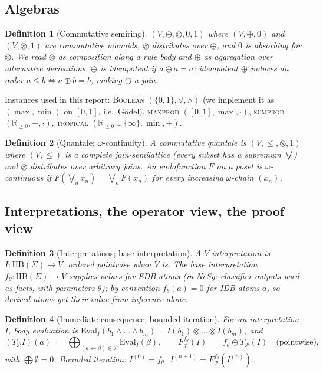 \documentclass[10pt]{article}
\newtheorem{definition}{Definition}[section]
\theoremstyle{remark}
\newcommand{\HB}{\mathrm{HB}}
\newcommand{\Eval}{\mathrm{Eval}}
\begin{document}
\subsection{Algebras}

\begin{definition}[Commutative semiring]\label{def:semiring}
$(V,\oplus,\otimes,0,1)$ where $(V,\oplus,0)$ and $(V,\otimes,1)$ are commutative monoids,
$\otimes$ distributes over $\oplus$, and $0$ is absorbing for $\otimes$. We read $\otimes$ as
composition along a rule body and $\oplus$ as aggregation over alternative derivations. $\oplus$ is
\emph{idempotent} if $a \oplus a = a$; idempotent $\oplus$ induces an order $a \le b
\Leftrightarrow a \oplus b = b$, making $\oplus$ a join.
\end{definition}

Instances used in this report: \textsc{Boolean} $(\{0,1\},\vee,\wedge)$ (we implement it as
$(\max,\min)$ on $[0,1]$, i.e.\ G\"odel), \textsc{maxprod} $([0,1],\max,\cdot)$,
\textsc{sumprod} $(\mathbb{R}_{\ge0},+,\cdot)$, \textsc{tropical}
$(\mathbb{R}_{\ge0}\cup\{\infty\},\min,+)$.

\begin{definition}[Quantale; $\omega$-continuity]\label{def:quantale}
A commutative \emph{quantale} is $(V,\le,\otimes,1)$ where $(V,\le)$ is a complete
join-semilattice (every subset has a supremum $\bigvee$) and $\otimes$ distributes over arbitrary
joins. An endofunction $F$ on a poset is \emph{$\omega$-continuous} if
$F(\bigvee_n x_n) = \bigvee_n F(x_n)$ for every increasing $\omega$-chain $(x_n)$.
\end{definition}

\subsection{Interpretations, the operator view, the proof view}

\begin{definition}[Interpretations; base interpretation]\label{def:base}
A \emph{$V$-interpretation} is $I : \HB(\Sigma) \to V$, ordered pointwise when $V$ is. The
\emph{base interpretation} $f_\theta : \HB(\Sigma) \to V$ supplies values for EDB atoms (in NeSy:
classifier outputs used as facts, with parameters $\theta$); by convention $f_\theta(a) = 0$ for
IDB atoms $a$, so derived atoms get their value from inference alone.
\end{definition}

\begin{definition}[Immediate consequence; bounded iteration]\label{def:tp}
For an interpretation $I$, body evaluation is $\Eval_I(b_1\wedge\dots\wedge b_m) = I(b_1) \otimes
\dots \otimes I(b_m)$, and
\[
(T_{\mathcal P} I)(a) \;=\; \bigoplus_{(a \leftarrow \beta)\in\mathcal P} \Eval_I(\beta),
\qquad
F^{f_\theta}_{\mathcal P}(I) \;=\; f_\theta \oplus T_{\mathcal P}(I)
\quad\text{(pointwise)},
\]
with $\bigoplus \emptyset = 0$. \emph{Bounded iteration}: $I^{(0)} = f_\theta$,\;
$I^{(n+1)} = F^{f_\theta}_{\mathcal P}(I^{(n)})$.
\end{definition}
\end{document}
